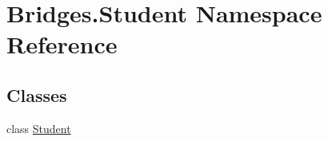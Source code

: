 \hypertarget{namespace_bridges_1_1_student}{}\section{Bridges.\+Student Namespace Reference}
\label{namespace_bridges_1_1_student}
\subsection*{Classes}
\begin{DoxyCompactItemize}
\item 
class \mbox{\hyperlink{class_bridges_1_1_student_1_1_student}{Student}}
\end{DoxyCompactItemize}
